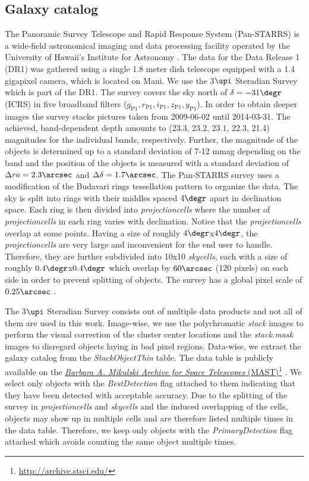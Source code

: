 \documentclass[a4paper,fleqn,usenatbib]{mnras}
\newcommand\fnurl[2]{%
  \href{#2}{#1}\footnote{\url{#2}}%
}
\begin{document}
\subsection{Galaxy catalog}
\label{sec:galaxies}
The Panoramic Survey Telescope and Rapid Response System (Pan-STARRS) is a wide-field astronomical imaging and data processing facility operated by the University of Hawaii's Institute for Astronomy \citep{kaiser2002pan,kaiser2010pan}. The data for the Data Release 1 (DR1) was gathered using a single 1.8 meter dish telescope equipped with a 1.4 gigapixel camera, which is located on Maui. We use the 3$\upi$ Steradian Survey which is part of the DR1. The survey covers the sky north of $\delta=-31\degr$ (ICRS) in five broadband filters ($g_{\mathrm{P1}}, r_{\mathrm{P1}}, i_{\mathrm{P1}}, z_{\mathrm{P1}}, y_{\mathrm{P1}}$). In order to obtain deeper images the survey stacks pictures taken from 2009-06-02 until 2014-03-31. The achieved, band-dependent depth amounts to (23.3, 23.2, 23.1, 22.3, 21.4) magnitudes for the individual bands, respectively. Further, the magnitude of the objects is determined up to a standard deviation of 7-12 mmag depending on the band and the position of the objects is measured with a standard deviation of $\Delta ra=2.3\arcsec$ and $\Delta \delta=1.7\arcsec$. The Pan-STARRS survey uses a modification of the Budavari rings tessellation pattern to organize the data. The sky is split into rings with their middles spaced $4 \degr$ apart in declination space. Each ring is then divided into \textit{projectioncells} where the number of \textit{projectioncells} in each ring varies with declination. Notice that the \textit{projectioncells} overlap at some points. Having a size of roughly $4\degr$x$4\degr$, the \textit{projectioncells} are very large and inconvenient for the end user to handle. Therefore, they are further subdivided into 10x10 \textit{skycells}, each with a size of roughly $0.4\degr$x$0.4\degr$ which overlap by $60\arcsec$ (120 pixels) on each side in order to prevent splitting of objects. The survey has a global pixel scale of $0.25\arcsec$ \citep{chambers2016pan}. 

The 3$\upi$ Steradian Survey consists out of multiple data products and not all of them are used in this work. Image-wise, we use the polychromatic \textit{stack} images to perform the visual correction of the cluster center locations and the \textit{stack.mask} images to disregard objects laying in bad pixel regions. Data-wise, we extract the galaxy catalog from the \textit{StackObjectThin} table. The data table is publicly available on the \fnurl{\textit{Barbara A. Mikulski Archive for Space Telescopes} (MAST)}{http://archive.stsci.edu/}. We select only objects with the \textit{BestDetection} flag attached to them indicating that they have been detected with acceptable accuracy. Due to the splitting of the survey in \textit{projectioncells} and \textit{skycells} and the induced overlapping of the cells, objects may show up in multiple cells and are therefore listed multiple times in the data table. Therefore, we keep only objects with the \textit{PrimaryDetection} flag attached which avoids counting the same object multiple times. 
\end{document}

